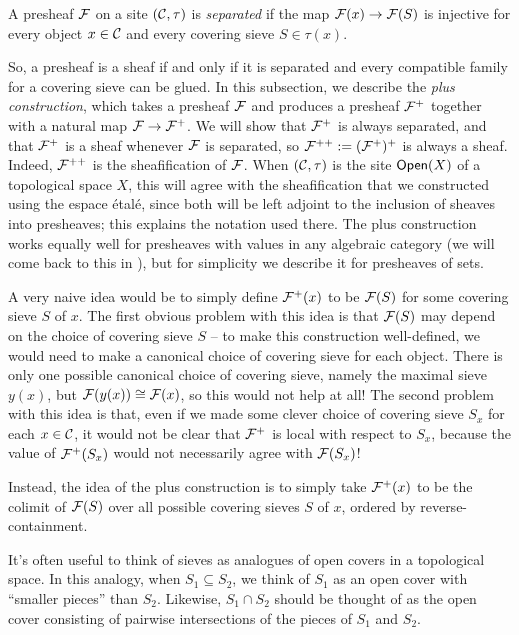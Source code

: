 \begin{definition}\label{def:chap:sheaves:sec:sites:separated presheaf}
    A presheaf $\cal{F}$ on a site $(\catC,\tau)$ is \emph{separated} if the map $\cal{F}(x) \to \cal{F}(S)$ is injective for every object $x \in \catC$ and every covering sieve $S \in \tau(x)$.
\end{definition}

So, a presheaf is a sheaf if and only if it is separated and every compatible family for a covering sieve can be glued. In this subsection, we describe the \emph{plus construction}, which takes a presheaf $\cal{F}$ and produces a presheaf $\cal{F}^+$ together with a natural map $\cal{F} \to \cal{F}^+$. We will show that $\cal{F}^+$ is always separated, and that $\cal{F}^+$ is a sheaf whenever $\cal{F}$ is separated, so $\cal{F}^{++} := (\cal{F}^+)^+$ is always a sheaf. Indeed, $\cal{F}^{++}$ is the sheafification of $\cal{F}$. When $(\catC,\tau)$ is the site $\Open(X)$ of a topological space $X$, this will agree with the sheafification that we constructed using the espace \'etal\'e, since both will be left adjoint to the inclusion of sheaves into presheaves; this explains the notation used there. The plus construction works equally well for presheaves with values in any algebraic category (we will come back to this in ), but for simplicity we describe it for presheaves of sets.

A very naive idea would be to simply define $\cal{F}^+(x)$ to be $\cal{F}(S)$ for some covering sieve $S$ of $x$. The first obvious problem with this idea is that $\cal{F}(S)$ may depend on the choice of covering sieve $S$ -- to make this construction well-defined, we would need to make a canonical choice of covering sieve for each object. There is only one possible canonical choice of covering sieve, namely the maximal sieve $y(x)$, but $\cal{F}(y(x)) \cong \cal{F}(x)$, so this would not help at all! The second problem with this idea is that, even if we made some clever choice of covering sieve $S_x$ for each $x \in \catC$, it would not be clear that $\cal{F}^+$ is local with respect to $S_x$, because the value of $\cal{F}^+(S_x)$ would not necessarily agree with $\cal{F}(S_x)$!

Instead, the idea of the plus construction is to simply take $\cal{F}^+(x)$ to be the colimit of $\cal{F}(S)$ over all possible covering sieves $S$ of $x$, ordered by reverse-containment.

\begin{remark}\label{remark:chap:sheaves:sec:sites:sieves as open covers}
    It's often useful to think of sieves as analogues of open covers in a topological space. In this analogy, when $S_1 \subseteq S_2$, we think of $S_1$ as an open cover with ``smaller pieces'' than $S_2$. Likewise, $S_1 \cap S_2$ should be thought of as the open cover consisting of pairwise intersections of the pieces of $S_1$ and $S_2$.
\end{remark}

